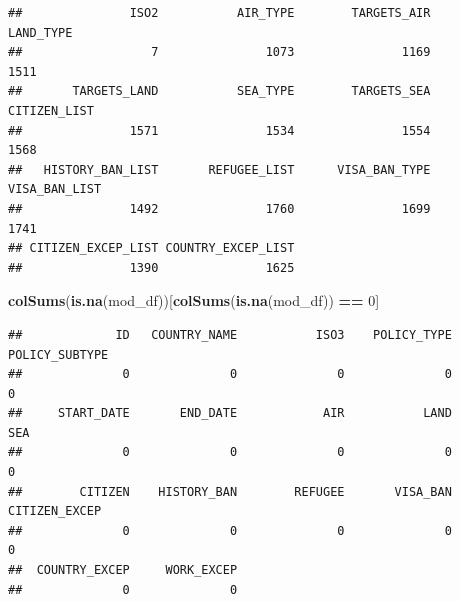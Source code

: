 \documentclass[]{article}
\newenvironment{Shaded}{\begin{snugshade}}{\end{snugshade}}
\newcommand{\DecValTok}[1]{\textcolor[rgb]{0.00,0.00,0.81}{#1}}
\newcommand{\KeywordTok}[1]{\textcolor[rgb]{0.13,0.29,0.53}{\textbf{#1}}}
\newcommand{\NormalTok}[1]{#1}
\newcommand{\OperatorTok}[1]{\textcolor[rgb]{0.81,0.36,0.00}{\textbf{#1}}}
\newcommand{\StringTok}[1]{\textcolor[rgb]{0.31,0.60,0.02}{#1}}
\begin{document}
\begin{verbatim}
##               ISO2           AIR_TYPE        TARGETS_AIR          LAND_TYPE 
##                  7               1073               1169               1511 
##       TARGETS_LAND           SEA_TYPE        TARGETS_SEA       CITIZEN_LIST 
##               1571               1534               1554               1568 
##   HISTORY_BAN_LIST       REFUGEE_LIST      VISA_BAN_TYPE      VISA_BAN_LIST 
##               1492               1760               1699               1741 
## CITIZEN_EXCEP_LIST COUNTRY_EXCEP_LIST 
##               1390               1625
\end{verbatim}

\begin{Shaded}
\begin{Highlighting}[]
\KeywordTok{colSums}\NormalTok{(}\KeywordTok{is.na}\NormalTok{(mod_df))[}\KeywordTok{colSums}\NormalTok{(}\KeywordTok{is.na}\NormalTok{(mod_df)) }\OperatorTok{==}\StringTok{ }\DecValTok{0}\NormalTok{]}
\end{Highlighting}
\end{Shaded}

\begin{verbatim}
##             ID   COUNTRY_NAME           ISO3    POLICY_TYPE POLICY_SUBTYPE 
##              0              0              0              0              0 
##     START_DATE       END_DATE            AIR           LAND            SEA 
##              0              0              0              0              0 
##        CITIZEN    HISTORY_BAN        REFUGEE       VISA_BAN  CITIZEN_EXCEP 
##              0              0              0              0              0 
##  COUNTRY_EXCEP     WORK_EXCEP 
##              0              0
\end{verbatim}
\end{document}

